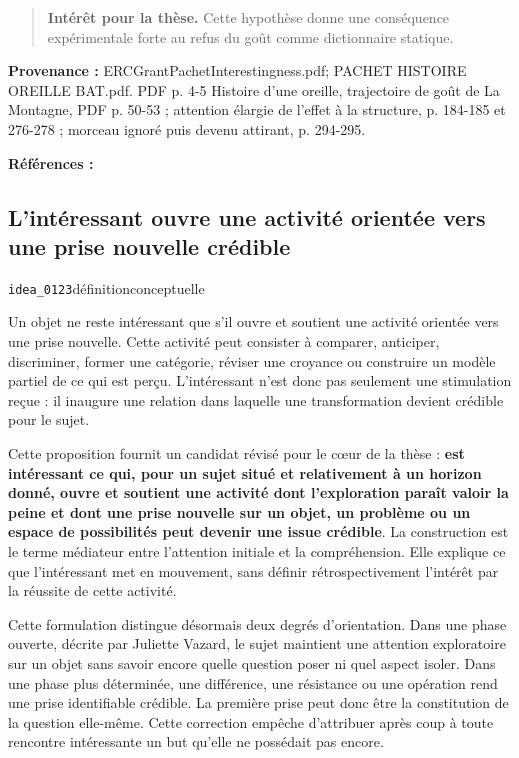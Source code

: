\documentclass[10pt,a4paper]{article}
\begin{document}
\begin{quote}
\textbf{Intérêt pour la thèse.} Cette hypothèse donne une conséquence expérimentale forte au refus du goût comme dictionnaire statique.
\end{quote}
{\footnotesize\color{metadata}\textbf{Provenance :} ERCGrantPachetInterestingness.pdf; PACHET HISTOIRE OREILLE BAT.pdf. PDF p. 4-5 Histoire d'une oreille, trajectoire de goût de La Montagne, PDF p. 50-53 ; attention élargie de l'effet à la structure, p. 184-185 et 276-278 ; morceau ignoré puis devenu attirant, p. 294-295.\par}
{\footnotesize\color{metadata}\textbf{Références :} \parencite{pachet2018oreille}\par}

\subsection{L'intéressant ouvre une activité orientée vers une prise nouvelle crédible}
{\small\color{metadata} \texttt{idea\_0123}\quad\textbullet\quad définition\quad\textbullet\quad conceptuelle\par}

Un objet ne reste intéressant que s'il ouvre et soutient une activité orientée vers une prise nouvelle. Cette activité peut consister à comparer, anticiper, discriminer, former une catégorie, réviser une croyance ou construire un modèle partiel de ce qui est perçu. L'intéressant n'est donc pas seulement une stimulation reçue : il inaugure une relation dans laquelle une transformation devient crédible pour le sujet.

Cette proposition fournit un candidat révisé pour le cœur de la thèse : \textbf{est intéressant ce qui, pour un sujet situé et relativement à un horizon donné, ouvre et soutient une activité dont l'exploration paraît valoir la peine et dont une prise nouvelle sur un objet, un problème ou un espace de possibilités peut devenir une issue crédible}. La construction est le terme médiateur entre l'attention initiale et la compréhension. Elle explique ce que l'intéressant met en mouvement, sans définir rétrospectivement l'intérêt par la réussite de cette activité.

Cette formulation distingue désormais deux degrés d'orientation. Dans une phase ouverte, décrite par Juliette Vazard, le sujet maintient une attention exploratoire sur un objet sans savoir encore quelle question poser ni quel aspect isoler. Dans une phase plus déterminée, une différence, une résistance ou une opération rend une prise identifiable crédible. La première prise peut donc être la constitution de la question elle-même. Cette correction empêche d'attribuer après coup à toute rencontre intéressante un but qu'elle ne possédait pas encore.
\end{document}
